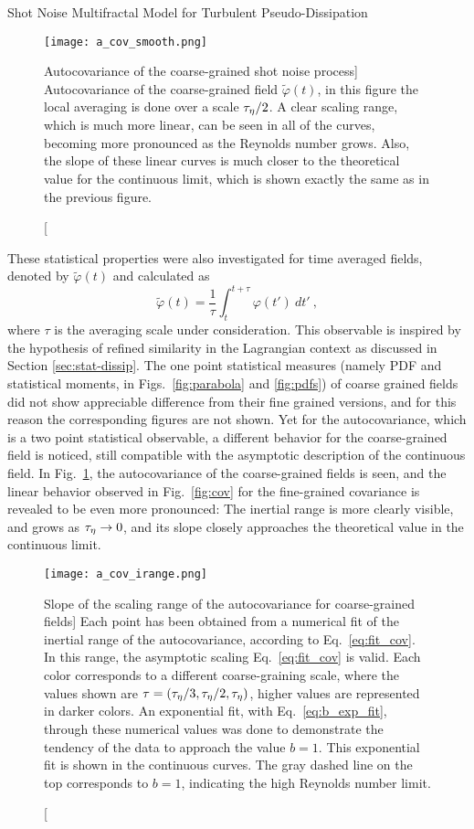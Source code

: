 \begin{chapter}{Shot Noise Multifractal Model for Turbulent Pseudo-Dissipation}
\begin{figure}[ht]
    \centering
    \texttt{[image: a\_cov\_smooth.png]}
    \caption
    [Autocovariance of the coarse-grained shot noise process]
    {Autocovariance of the coarse-grained field $\tilde\varphi(t)$, in this figure the local averaging is done over a scale $\tau_{\eta}/2$.
    A clear scaling range, which is much more linear, can be seen in all of the curves, becoming more pronounced as the Reynolds number grows. Also, the slope of these linear curves is much closer to the theoretical value for the continuous limit, which is shown exactly the same as in the previous figure.}
    \label{fig:cov_smooth}
\end{figure}

These statistical properties were also investigated for time averaged fields, denoted by $\tilde \varphi(t)$ and calculated as
\begin{equation} \label{eq:coarse-phi}
    \tilde \varphi(t) = \frac{1}{\tau} \int_{t}^{t+\tau} \varphi(t') \ dt' \ ,
\end{equation}
where $\tau$ is the averaging scale under consideration.
This observable is inspired by the hypothesis of refined similarity in the Lagrangian context as discussed in Section \ref{sec:stat-dissip}.
The one point statistical measures (namely PDF and statistical moments, in Figs.~\ref{fig:parabola} and \ref{fig:pdfs}) of coarse grained fields did not show appreciable difference from their fine grained versions, and for this reason the corresponding figures are not shown.
Yet for the autocovariance, which is a two point statistical observable, a different behavior for the coarse-grained field is noticed, still compatible with the asymptotic description of the continuous field.
In Fig.~\ref{fig:cov_smooth}, the autocovariance of the coarse-grained fields is seen, and the linear behavior observed in Fig.~\ref{fig:cov} for the fine-grained covariance is revealed to be even more pronounced:
The inertial range is more clearly visible, and grows as $\tau_{\eta}\to 0$, and its slope closely approaches the theoretical value in the continuous limit.

\begin{figure}[ht]
    \centering
    \texttt{[image: a\_cov\_irange.png]}
    \caption
    [Slope of the scaling range of the autocovariance for coarse-grained fields]
    {Each point has been obtained from a numerical fit of the inertial range of the autocovariance, according to Eq.~\eqref{eq:fit_cov}. In this range, the asymptotic scaling Eq.~\eqref{eq:fit_cov} is valid. Each color corresponds to a different coarse-graining scale, where the values shown are $\tau=(\tau_{\eta}/3,\tau_{\eta}/2,\tau_{\eta})$, higher values are represented in darker colors. An exponential fit, with Eq.~\eqref{eq:b_exp_fit}, through these numerical values was done to demonstrate the tendency of the data to approach the value $b=1$. This exponential fit is shown in the continuous curves. The gray dashed line on the top corresponds to $b=1$, indicating the high Reynolds number limit.}
    \label{fig:cov_irange}
\end{figure}


\end{chapter}
